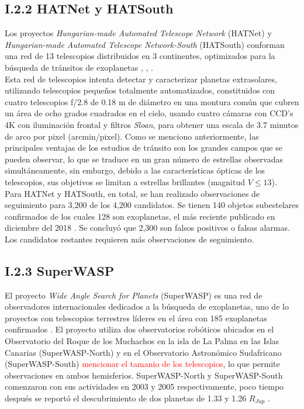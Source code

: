 \subsection*{I.2.2 HATNet y HATSouth}

Los proyectos \textit{Hungarian-made Automated Telescope Network} (HATNet) y \textit{Hungarian-made Automated Telescope Network-South} (HATSouth) conforman una red de 13 telescopios distribuidos en 3 continentes, optimizados para la búsqueda de tránsitos de exoplanetas \cite{bakos2002system}, \cite{bakos2004wide}, \cite{bakos2013hatsouth}. \\

Esta red de telescopios intenta detectar y caracterizar planetas extrasolares, utilizando telescopios pequeños totalmente automatizados, constituidos con cuatro telescopios f/2.8 de 0.18 m de diámetro en una montura común que cubren un área de ocho grados cuadrados en el cielo, usando cuatro cámaras con CCD's 4K con iluminación frontal y filtros \textit{Sloan}, para obtener una escala de 3.7 minutos de arco por pixel (arcmin/pixel). Como se menciono anteriormente, las principales ventajas de los estudios de tránsito son los grandes campos que se pueden observar, lo que se traduce en un gran número de estrellas observadas simultáneamente, sin embargo, debido a las características ópticas de los telescopios, sus objetivos se limitan a estrellas brillantes (magnitud $V \leq 13$).\\

Para HATNet y HATSouth, en total, se han realizado observaciones de seguimiento para 3,200 de los 4,200 candidatos. Se tienen 140 objetos subestelares confirmados de los cuales 128 son exoplanetas, el más reciente publicado en diciembre del 2018 \cite{bakos2018hats}. Se concluyó que 2,300 son falsos positivos o falsas alarmas. Los candidatos restantes requieren más observaciones de seguimiento.\\

\subsection*{I.2.3 SuperWASP}

El proyecto \textit{Wide Angle Search for Planets} (SuperWASP) es una red de observadores internacionales dedicados a la búsqueda de exoplanetas, uno de lo proyectos con telescopios terrestres líderes en el área con 185 exoplanetas confirmados \cite{pollacco2006wasp}. El proyecto utiliza dos observatorios robóticos ubicados en el Observatorio del Roque de los Muchachos en la isla de La Palma en las Islas Canarias (SuperWASP-North) y en el Observatorio Astronómico Sudafricano (SuperWASP-South) \textcolor{red}{mencionar el tamanio de los telescopios}, lo que permite observaciones en ambos hemisferios. SuperWASP-North y SuperWASP-South comenzaron con sus actividades en 2003 y 2005 respectivamente, poco tiempo después se reportó el descubrimiento de dos planetas de 1.33 y 1.26 $R_{Jup}$ \cite{cameron2007wasp}.\\


